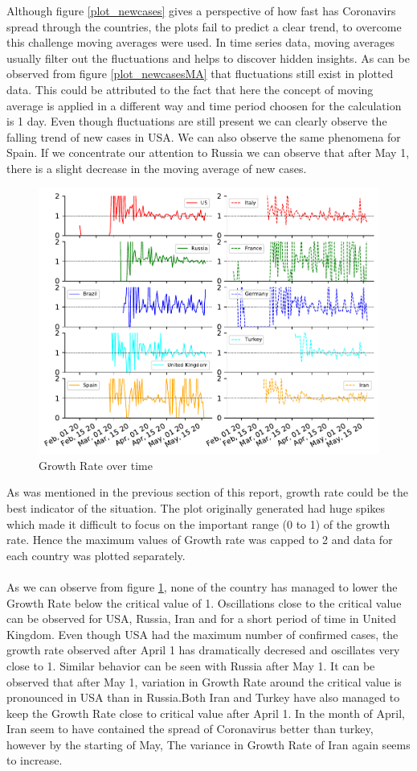 \documentclass[12pt, twosided]{report}  %
\begin{document}
Although figure \ref{plot_newcases} gives a perspective of how fast has Coronavirs spread through the countries, the plots fail to predict a clear trend, to overcome this challenge moving averages were used. In time series data, moving averages usually filter out the fluctuations and helps to discover hidden insights. As can be observed from figure \ref{plot_newcasesMA} that fluctuations still exist in plotted data. This could be attributed to the fact that here the concept of moving average is applied in a different way and time period choosen for the calculation is 1 day. Even though fluctuations are still present we can clearly observe the falling trend of new cases in USA. We can also observe the same phenomena for Spain. If we concentrate our attention to Russia we can observe that after May 1, there is a slight decrease in the moving average of new cases.

\begin{figure}[H]
	\centering
	\includegraphics[width=0.5\linewidth]{./images/plot-6.pdf}
	\caption{Growth Rate over time}
	\label{plot_growthrate}
\end{figure}

As was mentioned in the previous section of this report, growth rate could be the best indicator of the situation. The plot originally generated had huge spikes which made it difficult to focus on the important range (0 to 1) of the growth rate. Hence the maximum values of Growth rate was capped to 2 and data for each country was plotted separately.
\\
\\
As we can observe from figure \ref{plot_growthrate}, none of the country has managed to lower the Growth Rate below the critical value of 1. Oscillations close to the critical value can be observed for USA, Russia, Iran and for a short period of time in United Kingdom. Even though USA had the maximum number of confirmed cases, the growth rate observed after April 1 has dramatically decresed and oscillates very close to 1. Similar behavior can be seen with Russia after May 1. It can be observed that after May 1, variation in Growth Rate around the critical value is pronounced in USA than in Russia.Both Iran and Turkey have also managed to keep the Growth Rate close to critical value after April 1. In the month of April, Iran seem to have contained the spread of Coronavirus better than turkey, however by the starting of May, The variance in Growth Rate of Iran again seems to increase.
\end{document}
